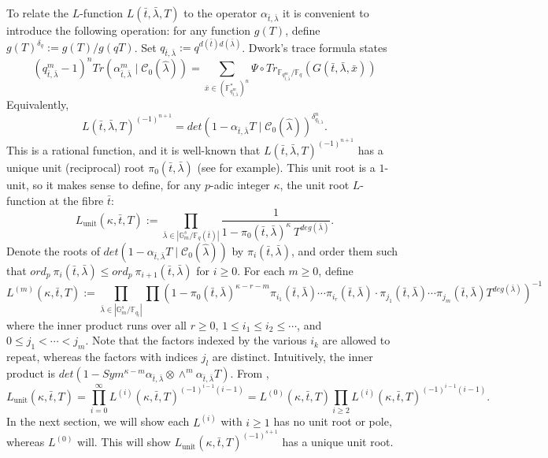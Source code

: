 \documentclass{article}
\theoremstyle{remark}
\def\bb #1{ {\mathbb #1} }
\def\c #1{ {\mathcal #1} }
\begin{document}
To relate the $L$-function $L(\bar t, \bar \lambda, T)$ to the operator $\alpha_{\bar t, \bar \lambda}$ it is convenient to introduce the following operation: for any function $g(T)$, define $g(T)^{\delta_q} := g(T) / g(qT)$. Set $q_{\bar t, \bar \lambda} := q^{d(\bar t) d(\bar \lambda)}$.  Dwork's trace formula states
\[
(q_{\bar t, \bar \lambda}^m-1)^n Tr(\alpha_{\bar t, \bar \lambda}^m \mid \c C_0(\hat \lambda)) = \sum_{\bar x \in \left(\bb F_{q_{\bar t, \bar \lambda}^m}^*\right)^n} \Psi \circ Tr_{\bb F_{q_{\bar t, \bar \lambda}^m} / \bb F_q}( G(\bar t, \bar \lambda, \bar x))
\]
Equivalently,
\[
L(\bar t, \bar \lambda, T)^{(-1)^{n+1}} = det(1 - \alpha_{\bar t, \bar \lambda} T \mid \c C_0(\hat \lambda))^{\delta_{q_{\bar t, \bar \lambda}}^n}.
\]
This is a rational function, and it is well-known that $L(\bar t, \bar \lambda, T)^{(-1)^{n+1}}$ has a unique unit (reciprocal) root $\pi_0(\bar t, \bar \lambda)$ (see \cite{MR2966711}  for example). This unit root is a $1$-unit, so it makes sense to define, for any $p$-adic integer $\kappa$, the unit root $L$-function at the fibre $\bar t$:
\[
L_{\text{unit}}(\kappa, \bar t, T) := \prod_{\bar \lambda \in |\bb G_m^{s} / \bb F_q(\bar t)|} \frac{1}{1 - \pi_0(\bar t, \bar \lambda)^\kappa \> T^{deg(\bar \lambda)}}.
\]
Denote the roots of $det(1 - \alpha_{\bar t, \bar \lambda} T \mid \c C_0(\hat \lambda) )$ by $\pi_i(\bar t, \bar \lambda)$, and order them such that $ord_p \> \pi_i(\bar t, \bar \lambda) \leq ord_p \> \pi_{i+1}(\bar t, \bar \lambda)$ for $i \geq 0$. For each $m \geq 0$, define
\[
L^{(m)}(\kappa, \bar t, T) := \prod_{\bar \lambda \in | \bb G_m^s / \bb F_{q_{\bar t}}|} \prod (1 - \pi_0(\bar t, \bar \lambda)^{\kappa - r - m} \pi_{i_1}(\bar t, \bar \lambda) \cdots \pi_{i_r}(\bar t, \bar \lambda) \cdot \pi_{j_1}(\bar t, \bar \lambda) \cdots \pi_{j_m}(\bar t, \bar \lambda) T^{deg(\bar \lambda)})^{-1}
\]
where the inner product runs over all $r \geq 0$, $1 \leq i_1 \leq i_2 \leq \cdots$, and $0 \leq j_1 < \cdots < j_m$. Note that the factors indexed by the various $i_k$ are allowed to repeat, whereas the factors with indices $j_l$ are distinct. Intuitively, the inner product is $det(1 - Sym^{\kappa - m} \alpha_{\bar t, \bar \lambda} \otimes \wedge^m \alpha_{\bar t, \bar \lambda} T)$. From \cite[Lemma 2.1]{MR3249829},
\begin{equation}\label{E: Adams}
L_\text{unit}( \kappa, \bar t, T) = \prod_{i = 0}^\infty L^{(i)}(\kappa, \bar t, T)^{(-1)^{i-1} (i-1)}
=L^{(0)}(\kappa,\bar t, T) \prod_{i \geq 2}L^{(i)}(\kappa, \bar t, T)^{(-1)^{i-1}(i-1)}.
\end{equation}
In the next section, we will show each $L^{(i)}$ with $i \geq 1$ has no unit root or pole, whereas $L^{(0)}$ will. This will show $L_\text{unit}(\kappa, \bar t, T)^{(-1)^{s+1}}$ has a unique unit root.
\end{document}
